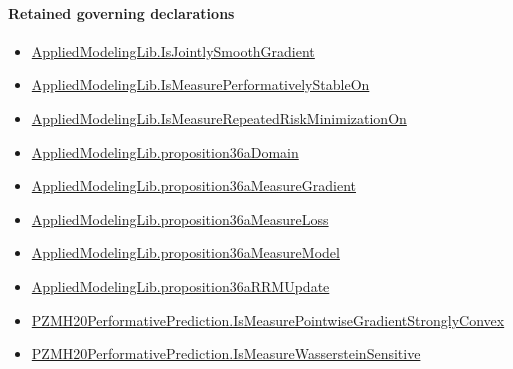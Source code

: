 \documentclass[10pt]{article}
\begin{document}
\paragraph{Retained governing declarations}
\begin{itemize}\raggedright
\item \hyperlink{library-prerequisite-2e05b739f5b71f23}{Applied\allowbreak{}Modeling\allowbreak{}Lib.\allowbreak{}Is\allowbreak{}Jointly\allowbreak{}Smooth\allowbreak{}Gradient}
\item \hyperlink{governing-declaration-522b06e211b1e40a}{Applied\allowbreak{}Modeling\allowbreak{}Lib.\allowbreak{}Is\allowbreak{}Measure\allowbreak{}Performatively\allowbreak{}Stable\allowbreak{}On}
\item \hyperlink{governing-declaration-6ae86e5703739171}{Applied\allowbreak{}Modeling\allowbreak{}Lib.\allowbreak{}Is\allowbreak{}Measure\allowbreak{}Repeated\allowbreak{}Risk\allowbreak{}Minimization\allowbreak{}On}
\item \hyperlink{governing-declaration-965db1948b41d1e4}{Applied\allowbreak{}Modeling\allowbreak{}Lib.\allowbreak{}proposition36a\allowbreak{}Domain}
\item \hyperlink{governing-declaration-6b5ac0170880188f}{Applied\allowbreak{}Modeling\allowbreak{}Lib.\allowbreak{}proposition36a\allowbreak{}Measure\allowbreak{}Gradient}
\item \hyperlink{governing-declaration-10c605398ed70a9b}{Applied\allowbreak{}Modeling\allowbreak{}Lib.\allowbreak{}proposition36a\allowbreak{}Measure\allowbreak{}Loss}
\item \hyperlink{governing-declaration-3d85baf63239a428}{Applied\allowbreak{}Modeling\allowbreak{}Lib.\allowbreak{}proposition36a\allowbreak{}Measure\allowbreak{}Model}
\item \hyperlink{governing-declaration-03f87e42b92f1bad}{Applied\allowbreak{}Modeling\allowbreak{}Lib.\allowbreak{}proposition36a\allowbreak{}RRM\allowbreak{}Update}
\item \hyperlink{governing-declaration-11c9ab6e3c6f528b}{PZMH20\allowbreak{}Performative\allowbreak{}Prediction.\allowbreak{}Is\allowbreak{}Measure\allowbreak{}Pointwise\allowbreak{}Gradient\allowbreak{}Strongly\allowbreak{}Convex}
\item \hyperlink{paper-prerequisite-2ea2f5769822c5c4}{PZMH20\allowbreak{}Performative\allowbreak{}Prediction.\allowbreak{}Is\allowbreak{}Measure\allowbreak{}Wasserstein\allowbreak{}Sensitive}
\end{itemize}
\end{document}
